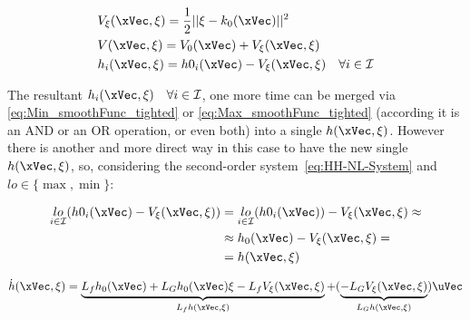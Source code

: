 \begin{subequations}
    \label{eq:Backstepp_CF_multipleCBF}
    \begin{align}
        &V_{\mathbf{\xi}}(\xVec, \mathbf{\xi}) = \frac{1}{2}|| \mathbf{\xi} -  k_0(\xVec) ||^2 
        \label{eq:Backstepp_prejudice_multipleCBF}\\
        &V(\xVec, \mathbf{\xi}) = V_0(\xVec) + V_{\mathbf{\xi}}(\xVec, \mathbf{\xi}) 
        \label{eq:Backstepp_V_multipleCBF}\\
        &h_i(\xVec, \mathbf{\xi}) = h0_i(\xVec) - V_{\mathbf{\xi}}(\xVec, \mathbf{\xi}) \quad \forall i \in \mathcal{I}
        \label{eq:Backstepp_h_multipleCBF}
    \end{align}
\end{subequations}

The resultant  \(h_i(\xVec, \mathbf{\xi}) \quad \forall i \in \mathcal{I}\), one more time can be merged via \eqref{eq:Min_smoothFunc_tighted} or \eqref{eq:Max_smoothFunc_tighted} (according it is an AND or an OR operation, or even both) into a single  \(h(\xVec, \mathbf{\xi})\). However there is another and more direct way in this case to have the new single  \(h(\xVec, \mathbf{\xi})\), so, considering the second-order system~\eqref{eq:HH-NL-System} and \(lo \in \{\max, \min\}\):

\begin{align}
        \underset{ i \in \mathcal{I}}{lo}(h0_i(\xVec) - V_{\mathbf{\xi}}(\xVec, \mathbf{\xi})) &= \underset{ i \in \mathcal{I}}{lo}(h0_i(\xVec)) - V_{\mathbf{\xi}}(\xVec, \mathbf{\xi}) \approx 
                                                                                                \notag\\
                                                                                               &\approx h_0(\xVec) - V_{\mathbf{\xi}}(\xVec, \mathbf{\xi}) = 
                                                                                               \notag\\
                                                                                               &=h(\xVec, \mathbf{\xi})
                                                                                               \label{eq:Backstepp_h_multipleCBF2}
\end{align}

\begin{equation}
        \dot{h}(\xVec, \mathbf{\xi}) = \underbrace{L_fh_0(\xVec) + L_Gh_0(\xVec)\mathbf{\xi} - L_fV_{\mathbf{\xi}}(\xVec, \mathbf{\xi})}_{L_fh(\xVec, \mathbf{\xi})} + (\underbrace{- L_GV_{\mathbf{\xi}}(\xVec, \mathbf{\xi})}_{L_Gh(\xVec, \mathbf{\xi})}) \uVec
        \label{eq:Backstepp_h_multipleCBF_derivatives2}
\end{equation}


